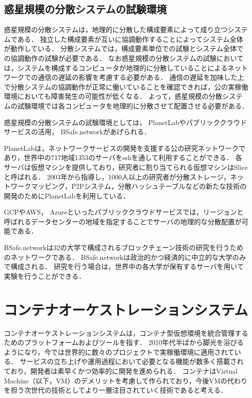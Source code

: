 \subsection{惑星規模の分散システムの試験環境}
\label{bg:staging:planetary-scale-distributed-system}

惑星規模の分散システムは，地理的に分散した構成要素によって成り立つシステムである．
独立した構成要素が互いに協調動作することによってシステム全体が動作している．
分散システムでは，構成要素単位での試験とシステム全体での協調動作の試験が必要である．
なお惑星規模の分散システムの試験においては，システムを構成するコンピュータが地理的に分散していることによるネットワークでの通信の遅延の影響を考慮する必要がある．
通信の遅延を加味した上で分散システムの協調動作が正常に働いていることを確認できれば，公の実稼働環境においても障害発生の可能性が低くなる．
よって，惑星規模の分散システムの試験環境では各コンピュータを地理的に分散させて配置させる必要がある．

惑星規模の分散システムの試験環境としては， PlanetLabやパブリッククラウドサービスの活用， BSafe.networkがあげられる．

PlanetLabは，ネットワークサービスの開発を支援する公の研究ネットワークであり，世界中の717地域1353のサーバをsshを通して利用することができる．
各サーバは仮想マシンを提供しており，研究者に割り当てられる仮想マシンはSliceと呼ばれる．
2003年から指導し，1000人以上の研究者が分散ストレージ，ネットワークマッピング，P2Pシステム，分散ハッシュテーブルなどの新たな技術の開発のためにPlanetLabを利用している．

GCPやAWS， Azureといったパブリッククラウドサービスでは，リージョンと呼ばれるデータセンターの地域を指定することでサーバの地理的な分散配置が可能である．

BSafe.networkは32の大学で構成されるブロックチェーン技術の研究を行うためのネットワークである．
BSafe.networkは政治的かつ経済的に中立的な大学のみで構成される．
研究を行う場合は，世界中の各大学が保有するサーバを用いて実験を行うことができる．

\section{コンテナオーケストレーションシステム}
\label{background:container-orchestration-system}

コンテナオーケストレーションシステムは，コンテナ型仮想環境を統合管理するためのプラットフォームおよびツールを指す．
2010年代半ばから脚光を浴びるようになり，今では世界的に数々のプロジェクトで実稼働環境に適用されている．
サービスの立ち上げや運用過程において必要となる機能が数多く搭載されており，開発者は素早くかつ効率的に開発を進められる．
コンテナはVirtual Machine（以下，VM）のデメリットを考慮して作られており，今後VMの代わりを担う次世代の技術としてより一層注目されていく技術であると考える．

